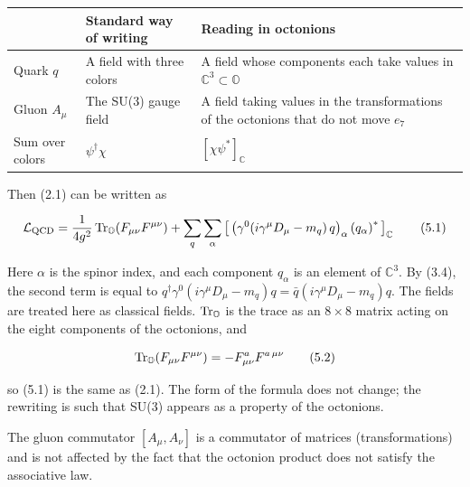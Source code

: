 \documentclass[
  a4paper,
]{article}
\newcounter{none} %
\begin{document}
{\def\LTcaptype{none} %
\begin{longtable}[]{@{}
  >{\raggedright\arraybackslash}p{}
  >{\raggedright\arraybackslash}p{}
  >{\raggedright\arraybackslash}p{}@{}}
\toprule\noalign{}
\begin{minipage}[b]{\linewidth}\raggedright
\end{minipage} & \begin{minipage}[b]{\linewidth}\raggedright
Standard way of writing
\end{minipage} & \begin{minipage}[b]{\linewidth}\raggedright
Reading in octonions
\end{minipage} \\
\midrule\noalign{}
\endhead
\bottomrule\noalign{}
\endlastfoot
Quark \(q\) & A field with three colors & A field whose components each
take values in \(\mathbb{C}^3\subset\mathbb{O}\) \\
Gluon \(A_\mu\) & The SU(3) gauge field & A field taking values in the
transformations of the octonions that do not move \(e_7\) \\
Sum over colors & \(\psi^\dagger\chi\) & \([\chi\psi^*]_{\mathbb C}\) \\
\end{longtable}
}

Then (2.1) can be written as

\[
\mathcal{L}_{\rm QCD} = \frac{1}{4g^2}\,{\rm Tr}_{\mathbb O}\!\left(F_{\mu\nu}F^{\mu\nu}\right)
+ \sum_q \sum_\alpha \left[\,\left(\gamma^0 (i\gamma^\mu D_\mu - m_q)\,q\right)_\alpha \left(q_{\alpha}\right)^{*}\,\right]_{\mathbb C} \tag{5.1}
\]

Here \(\alpha\) is the spinor index, and each component \(q_\alpha\) is
an element of \(\mathbb{C}^3\). By (3.4), the second term is equal to
\(q^\dagger\gamma^0(i\gamma^\mu D_\mu - m_q)q = \bar q(i\gamma^\mu D_\mu - m_q)q\).
The fields are treated here as classical fields.
\({\rm Tr}_{\mathbb O}\) is the trace as an \(8\times8\) matrix acting
on the eight components of the octonions, and

\[
{\rm Tr}_{\mathbb O}(F_{\mu\nu}F^{\mu\nu}) = -F^a_{\mu\nu}F^{a\,\mu\nu} \tag{5.2}
\]

so (5.1) is the same as (2.1). The form of the formula does not change;
the rewriting is such that SU(3) appears as a property of the octonions.

The gluon commutator \([A_\mu, A_\nu]\) is a commutator of matrices
(transformations) and is not affected by the fact that the octonion
product does not satisfy the associative law.
\end{document}
